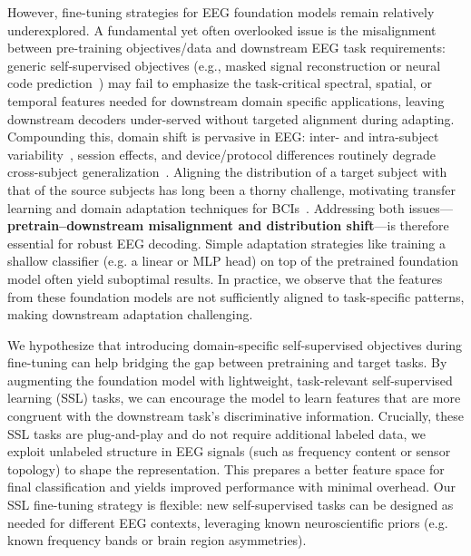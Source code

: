 \documentclass{article} %
\begin{document}
However, fine-tuning strategies for EEG foundation models remain relatively underexplored. A fundamental yet often overlooked issue is the misalignment between pre-training objectives/data and downstream EEG task requirements: generic self-supervised objectives (e.g., masked signal reconstruction or neural code prediction~\citep{he2022masked,wang2024cbramod,jiang2024large}) may fail to emphasize the task-critical spectral, spatial, or temporal features needed for downstream domain specific applications, leaving downstream decoders under-served without targeted alignment during adapting. Compounding this, domain shift is pervasive in EEG: inter- and intra-subject variability~\citep{saha2020intra}, session effects, and device/protocol differences routinely degrade cross-subject generalization~\citep{melnik2017systems}. Aligning the distribution of a target subject with that of the source subjects has long been a thorny challenge, motivating transfer learning and domain adaptation techniques for BCIs~\citep{zhao2020deep,lan2018domain,duan2023domain}.  Addressing both issues—\textbf{pretrain–downstream misalignment and distribution shift}—is therefore essential for robust EEG decoding. Simple adaptation strategies like training a shallow classifier (e.g. a linear or MLP head) on top of the pretrained foundation model often yield suboptimal results.  In practice, we observe that the features from these foundation models are not sufficiently aligned to task-specific patterns, making downstream adaptation challenging.

We hypothesize that introducing domain-specific self-supervised objectives during fine-tuning can help bridging the gap between pretraining and target tasks. By augmenting the foundation model with lightweight, task-relevant self-supervised learning (SSL) tasks, we can encourage the model to learn features that are more congruent with the downstream task’s discriminative information. Crucially, these SSL tasks are plug-and-play and do not require additional labeled data, we exploit unlabeled structure in EEG signals (such as frequency content or sensor topology) to shape the representation. This prepares a better feature space for final classification and yields improved performance with minimal overhead. Our SSL fine-tuning strategy is flexible: new self-supervised tasks can be designed as needed for different EEG contexts, leveraging known neuroscientific priors (e.g. known frequency bands or brain region asymmetries).
\end{document}
